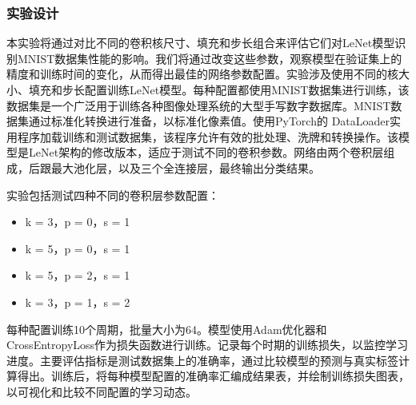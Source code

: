 \documentclass[a4paper,12pt]{article}
\begin{document}
\subsubsection{实验设计}
本实验将通过对比不同的卷积核尺寸、填充和步长组合来评估它们对LeNet模型识别MNIST数据集性能的影响。我们将通过改变这些参数，观察模型在验证集上的精度和训练时间的变化，从而得出最佳的网络参数配置。实验涉及使用不同的核大小、填充和步长配置训练LeNet模型。每种配置都使用MNIST数据集进行训练，该数据集是一个广泛用于训练各种图像处理系统的大型手写数字数据库。MNIST数据集通过标准化转换进行准备，以标准化像素值。使用PyTorch的
DataLoader实用程序加载训练和测试数据集，该程序允许有效的批处理、洗牌和转换操作。该模型是LeNet架构的修改版本，适应于测试不同的卷积参数。网络由两个卷积层组成，后跟最大池化层，以及三个全连接层，最终输出分类结果。

实验包括测试四种不同的卷积层参数配置：
\begin{itemize}
	\item k = 3，p = 0，s = 1
	\item k = 5，p = 0，s = 1
	\item k = 5，p = 2，s = 1
	\item k = 3，p = 1，s = 2
\end{itemize}

每种配置训练10个周期，批量大小为64。模型使用Adam优化器和
CrossEntropyLoss作为损失函数进行训练。记录每个时期的训练损失，以监控学习进度。主要评估指标是测试数据集上的准确率，通过比较模型的预测与真实标签计算得出。训练后，将每种模型配置的准确率汇编成结果表，并绘制训练损失图表，以可视化和比较不同配置的学习动态。
\end{document}
